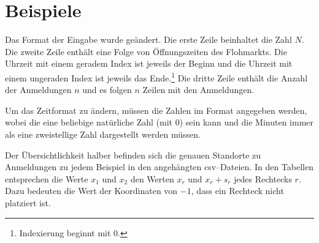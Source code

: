 \newpage
\section{Beispiele}
Das Format der Eingabe wurde geändert. 
Die erste Zeile beinhaltet die Zahl $N$.
Die zweite Zeile enthält eine Folge von Öffnungszeiten des Flohmarkts.
Die Uhrzeit mit einem geradem Index ist jeweils der Beginn und die Uhrzeit 
mit einem ungeraden Index ist jeweils das Ende.\footnote{Indexierung beginnt mit 0.}
Die dritte Zeile enthält die Anzahl der Anmeldungen $n$ und es folgen $n$ Zeilen mit den Anmeldungen.

Um das Zeitformat zu ändern, müssen die Zahlen im Format  angegeben werden, wobei 
die  eine beliebige natürliche Zahl (mit 0) sein kann und
die Minuten  immer als eine zweistellige Zahl dargestellt werden müssen.

Der Übersichtlichkeit halber befinden sich die genauen Standorte zu Anmeldungen
zu jedem Beispiel in den angehängten csv--Dateien.
In den Tabellen entsprechen die Werte $x_1$ und $x_2$ den Werten 
$x_r$ und $x_r + s_r$ jedes Rechtecks $r$.
Dazu bedeuten die Wert der Koordinaten von $-1$, dass ein Rechteck nicht platziert ist.











